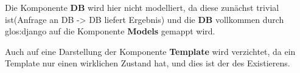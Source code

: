 Die Komponente \textbf{DB} wird hier nicht modelliert, da diese zunächst trivial ist(Anfrage an DB -> DB liefert Ergebnis) und die \textbf{DB} vollkommen durch \gls{glos:django} auf die Komponente \textbf{Models} gemappt wird.

Auch auf eine Darstellung der Komponente \textbf{Template} wird verzichtet, da ein Template nur einen wirklichen Zustand hat, und dies ist der des Existierens. 






